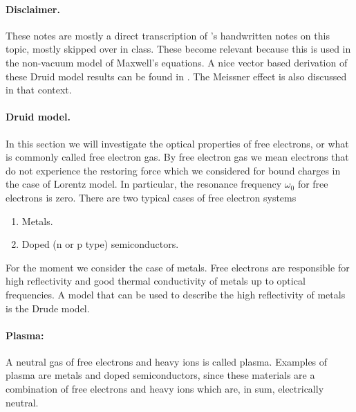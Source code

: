 \paragraph{Disclaimer.}
%
These notes are mostly a direct transcription of \mo's handwritten notes on this topic, mostly skipped over in class.  These become relevant because this is used in the non-vacuum model of Maxwell's equations.
%
A nice vector based derivation of these Druid model results can be found in \citep{ashcroft1976solid}.  The Meissner effect is also discussed in that context.
%
\paragraph{Druid model.}
%
In this section we will investigate the optical properties of free electrons, or what is commonly called free electron gas.
%
By free electron gas we mean electrons that do not experience the restoring force which we considered for bound charges in the case of Lorentz model.  In particular, the resonance frequency \( \omega_0 \) for free electrons is zero.
%
There are two typical cases of free electron systems
%
\begin{enumerate}[a]
\item Metals.
\item Doped (n or p type) semiconductors.
\end{enumerate}
%
For the moment we consider the case of metals.
%
Free electrons are responsible for high reflectivity and good thermal conductivity of metals up to optical frequencies.  A model that can be used to describe the high reflectivity of metals is the Drude model.
%
\paragraph{Plasma:} A neutral gas of free electrons and heavy ions is called plasma.  Examples of plasma are metals and doped semiconductors, since these materials are a combination of free electrons and heavy ions which are, in sum, electrically neutral.
%
